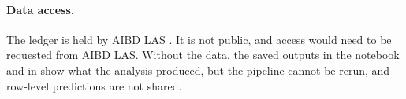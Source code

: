 \paragraph{Data access.} The ledger is held by AIBD LAS \citep{aibd2025ledger}. It is not public, and access would need to be requested from AIBD LAS. Without the data, the saved outputs in the notebook and in  show what the analysis produced, but the pipeline cannot be rerun, and row-level predictions are not shared.
